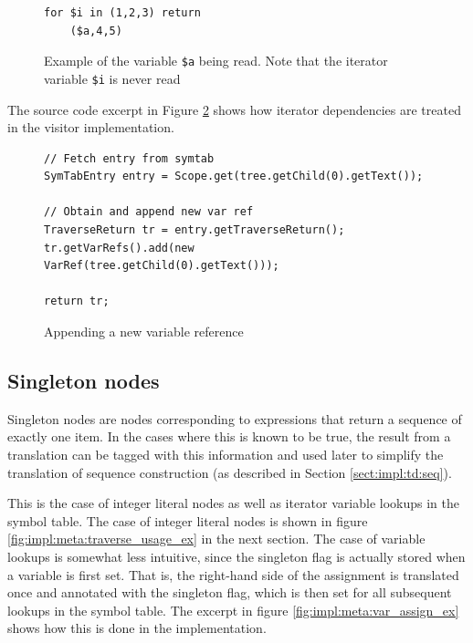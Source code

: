 \begin{figure}[!htp]
\begin{center}
\begin{minipage}[h]{5cm}
\begin{verbatim}
for $i in (1,2,3) return 
    ($a,4,5)
\end{verbatim}
\end{minipage}
  \caption{Example of the variable \texttt{\$a} being read. Note that the iterator
  variable \texttt{\$i} is never read}
  \label{fig:impl:meta:var_ref_ex}
\end{center}
\end{figure}

The source code excerpt in Figure \ref{fig:impl:meta:var_ref_impl2} shows how
iterator dependencies are treated in the visitor implementation.

\begin{figure}[!htp]
\begin{center}
\begin{Verbatim}
// Fetch entry from symtab
SymTabEntry entry = Scope.get(tree.getChild(0).getText());
            
// Obtain and append new var ref
TraverseReturn tr = entry.getTraverseReturn();
tr.getVarRefs().add(new VarRef(tree.getChild(0).getText()));

return tr;
\end{Verbatim}
  \caption{Appending a new variable reference}
  \label{fig:impl:meta:var_ref_impl2}
\end{center}
\end{figure}

\subsection{Singleton nodes}
Singleton nodes are nodes corresponding to expressions that return a sequence of exactly one item. In
the cases where this is known to be true, the result from a translation can be
tagged with this information and used later to simplify the translation of
sequence construction (as described in Section \ref{sect:impl:td:seq}).

This is the case of integer literal nodes as well as iterator variable lookups in the
symbol table. The case of integer literal nodes is shown in figure
\ref{fig:impl:meta:traverse_usage_ex} in the next section. The case of variable
lookups is somewhat less intuitive, since the singleton flag is actually
stored when a variable is first set. That is, the right-hand side of the
assignment is translated once and annotated with the singleton flag, which is
then set for all subsequent lookups in the symbol table. The excerpt in figure 
\ref{fig:impl:meta:var_assign_ex} shows how this is done in the implementation.

